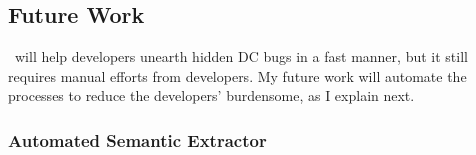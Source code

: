 \documentclass[10pt]{article}
\begin{document}




\subsection{Future Work}

\fullcheck\ will help developers unearth hidden DC bugs in a fast manner, but it
still requires manual efforts from developers. My future work will automate the
processes to reduce the developers' burdensome, as I explain next.

\subsubsection*{Automated Semantic Extractor}
\end{document}
